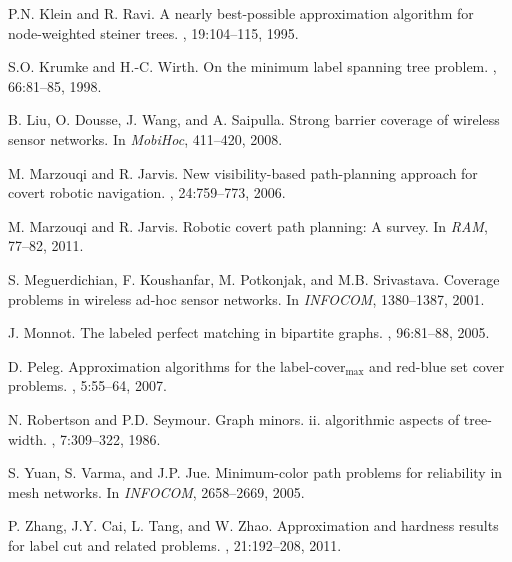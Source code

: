 \documentclass[12pt]{article}
\begin{document}
{\begin{thebibliography}{10}
P.N. Klein and R. Ravi.
\newblock A nearly best-possible approximation algorithm for node-weighted
  steiner trees.
, 19:104--115, 1995.

S.O. Krumke and H.-C. Wirth.
\newblock On the minimum label spanning tree problem.
, 66:81--85, 1998.

B. Liu, O. Dousse, J. Wang, and A. Saipulla.
\newblock Strong barrier coverage of wireless sensor networks.
\newblock In {\em MobiHoc}, 411--420, 2008.

M. Marzouqi and R. Jarvis.
\newblock New visibility-based path-planning approach for covert robotic
  navigation.
, 24:759--773, 2006.

M. Marzouqi and R. Jarvis.
\newblock Robotic covert path planning: A survey.
\newblock In {\em RAM}, 77--82, 2011.

S. Meguerdichian, F. Koushanfar, M. Potkonjak, and M.B. Srivastava.
\newblock Coverage problems in wireless ad-hoc sensor networks.
\newblock In {\em INFOCOM}, 1380--1387, 2001.

J. Monnot.
\newblock The labeled perfect matching in bipartite graphs.
, 96:81--88, 2005.

D. Peleg.
\newblock Approximation algorithms for the label-cover$_{\mbox{max}}$ and
  red-blue set cover problems.
, 5:55--64, 2007.

N. Robertson and P.D. Seymour.
\newblock Graph minors. ii. algorithmic aspects of tree-width.
, 7:309--322, 1986.

S. Yuan, S. Varma, and J.P. Jue.
\newblock Minimum-color path problems for reliability in mesh networks.
\newblock In {\em INFOCOM}, 2658--2669, 2005.

P. Zhang, J.Y. Cai, L. Tang, and W. Zhao.
\newblock Approximation and hardness results for label cut and related
  problems.
, 21:192--208, 2011.

\end{thebibliography}

}
\end{document}
